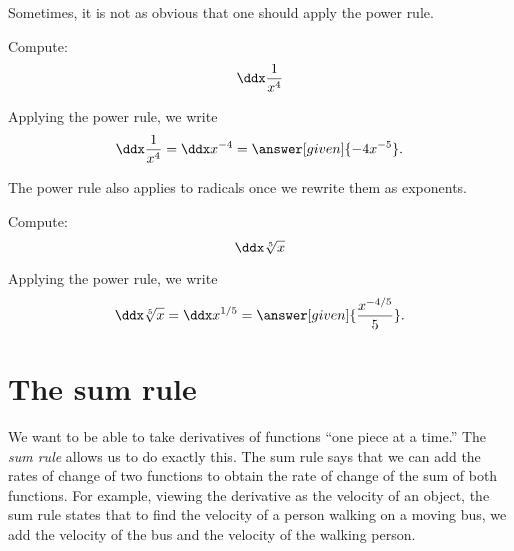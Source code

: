 \documentclass{ximera}
\begin{document}
Sometimes, it is not as obvious that one should apply the power rule.

\begin{example}
Compute:
\[
\ddx \frac{1}{x^4}
\]
\begin{explanation}
Applying the power rule, we write
\[
\ddx \frac{1}{x^4} = \ddx x^{-4} = \answer[given]{-4x^{-5}}.
\]
\end{explanation}
\end{example}

The power rule also applies to radicals once we rewrite them as exponents.

\begin{example}
Compute:
\[
\ddx \sqrt[5]{x}
\]
\begin{explanation}
Applying the power rule, we write
\[
\ddx \sqrt[5]{x} = \ddx x^{1/5} = \answer[given]{\frac{x^{-4/5}}{5}}.
\]
\end{explanation}
\end{example}






\section{The sum rule}

We want to be able to take derivatives of functions ``one piece at a
time.'' The \textit{sum rule} allows us to do exactly this. The sum rule says
that we can add the rates of change of two functions to obtain the
rate of change of the sum of both functions. For example, viewing the
derivative as the velocity of an object, the sum rule states that to find the
velocity of a person walking on a moving bus, we add the
velocity of the bus and the velocity of the walking person.
\end{document}
